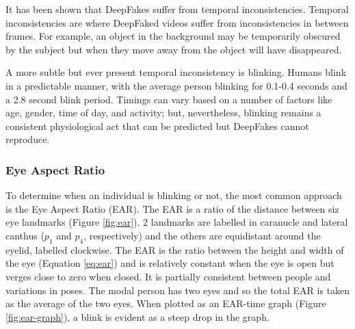 It has been shown that DeepFakes suffer from temporal inconsistencies\cite{juefei2022countering}. Temporal inconsistencies are where DeepFaked videos suffer from inconsistencies in between frames. For example, an object in the background may be temporarily obscured by the subject but when they move away from the object will have disappeared. 

A more subtle but ever present temporal inconsistency is blinking. Humans blink in a predictable manner, with the average person blinking for 0.1-0.4 seconds and a 2.8 second blink period\cite{schiffman1990sensation}. Timings can vary based on a number of factors like age, gender, time of day, and activity\cite{jung2020deepvision}; but, nevertheless, blinking remains a consistent physiological act that can be predicted but DeepFakes cannot reproduce.

\subsubsection{Eye Aspect Ratio}

To determine when an individual is blinking or not, the most common approach is the Eye Aspect Ratio (EAR)\cite{soukupova2016eye}. The EAR is a ratio of the distance between siz eye landmarks (Figure \ref{fig:ear}). 2 landmarks are labelled in caranucle and lateral canthus ($p_1$ and $p_4$, respectively) and the others are equidistant around the eyelid, labelled clockwise. The EAR is the ratio between the height and width of the eye (Equation \ref{eq:ear}) and is relatively constant when the eye is open but verges close to zero when closed. It is partially consistent between people and variations in poses. The modal person has two eyes and so the total EAR is taken as the average of the two eyes. When plotted as an EAR-time graph (Figure \ref{fig:ear-graph}), a blink is evident as a steep drop in the graph. 


